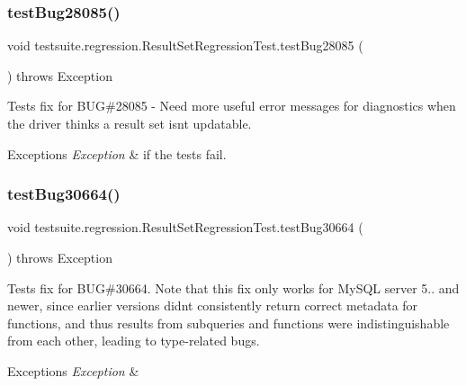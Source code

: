 \subsubsection{\texorpdfstring{test\+Bug28085()}{testBug28085()}}
{\footnotesize\ttfamily void testsuite.\+regression.\+Result\+Set\+Regression\+Test.\+test\+Bug28085 (\begin{DoxyParamCaption}{ }\end{DoxyParamCaption}) throws Exception}

Tests fix for B\+UG\#28085 -\/ Need more useful error messages for diagnostics when the driver thinks a result set isn\textquotesingle{}t updatable.


\begin{DoxyExceptions}{Exceptions}
{\em Exception} & if the tests fail. \\
\hline
\end{DoxyExceptions}
\mbox{\label{classtestsuite_1_1regression_1_1_result_set_regression_test_a4a7f176d9e3539b3acd902e97e904e17}} 
\subsubsection{\texorpdfstring{test\+Bug30664()}{testBug30664()}}
{\footnotesize\ttfamily void testsuite.\+regression.\+Result\+Set\+Regression\+Test.\+test\+Bug30664 (\begin{DoxyParamCaption}{ }\end{DoxyParamCaption}) throws Exception}

Tests fix for B\+UG\#30664. Note that this fix only works for My\+S\+QL server 5.. and newer, since earlier versions didn\textquotesingle{}t consistently return correct metadata for functions, and thus results from subqueries and functions were indistinguishable from each other, leading to type-\/related bugs.


\begin{DoxyExceptions}{Exceptions}
{\em Exception} & \\
\hline
\end{DoxyExceptions}
\mbox{\label{classtestsuite_1_1regression_1_1_result_set_regression_test_a0e05299d6e5dcb1d9f65b8d2ea261ce4}} 
